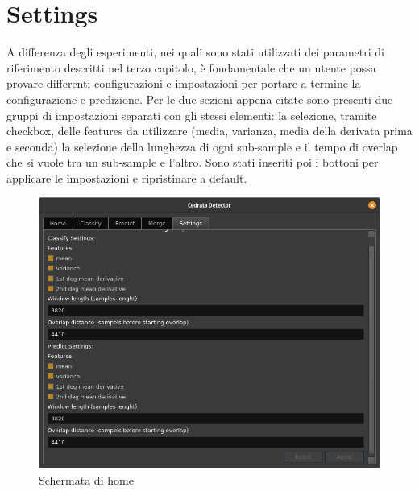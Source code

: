 \section{Settings}
A differenza degli esperimenti, nei quali sono stati utilizzati dei parametri di riferimento descritti nel terzo capitolo, è fondamentale che un utente possa provare differenti configurazioni e impostazioni per portare a termine la configurazione e predizione. Per le due sezioni appena citate sono presenti due gruppi di impostazioni separati con gli stessi elementi: la selezione, tramite checkbox, delle features da utilizzare (media, varianza, media della derivata prima e seconda) la selezione della lunghezza di ogni sub-sample e il tempo di overlap che si vuole tra un sub-sample e l'altro. Sono stati inseriti poi i bottoni per applicare le impostazioni e ripristinare a default.
\begin{figure}[h!]
	\begin{center}
		\includegraphics[scale=0.5]{./immagini/gui/settings.png}
	\end{center}
	\caption{Schermata di home}\label{fig:gui-settings}
\end{figure}